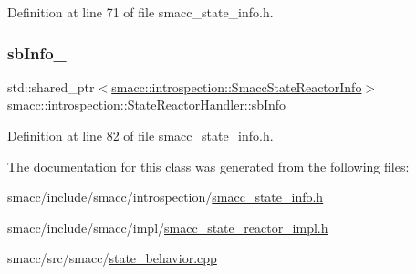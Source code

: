 Definition at line 71 of file smacc\+\_\+state\+\_\+info.\+h.

\mbox{\label{classsmacc_1_1introspection_1_1StateReactorHandler_a6dbf5d1458265c3565e18ac77851ae63}} 
\subsubsection{\texorpdfstring{sb\+Info\+\_\+}{sbInfo\_}}
{\footnotesize\ttfamily std\+::shared\+\_\+ptr$<$\hyperlink{structsmacc_1_1introspection_1_1SmaccStateReactorInfo}{smacc\+::introspection\+::\+Smacc\+State\+Reactor\+Info}$>$ smacc\+::introspection\+::\+State\+Reactor\+Handler\+::sb\+Info\+\_\+}



Definition at line 82 of file smacc\+\_\+state\+\_\+info.\+h.



The documentation for this class was generated from the following files\+:\begin{DoxyCompactItemize}
\item 
smacc/include/smacc/introspection/\hyperlink{smacc__state__info_8h}{smacc\+\_\+state\+\_\+info.\+h}\item 
smacc/include/smacc/impl/\hyperlink{smacc__state__reactor__impl_8h}{smacc\+\_\+state\+\_\+reactor\+\_\+impl.\+h}\item 
smacc/src/smacc/\hyperlink{state__behavior_8cpp}{state\+\_\+behavior.\+cpp}\end{DoxyCompactItemize}

